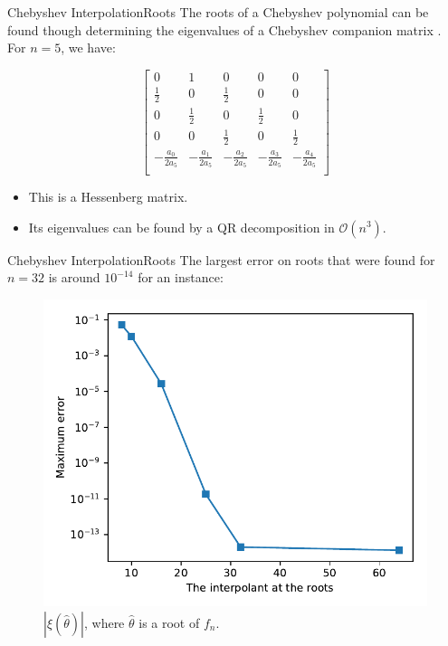 \documentclass{beamer}
\newcommand{\bigO}{\mathscr{O}}
\begin{document}
\begin{frame}{Chebyshev Interpolation}{Roots}
	The roots of a Chebyshev polynomial can be found though determining the eigenvalues of a Chebyshev companion matrix \cite{boyd:2013}. For $n=5$, we have:
	
	\begin{equation*}
	\left[\begin{array}{cccccc}
	0&1&0&0&0\\
	\frac{1}{2} & 0 & \frac{1}{2} & 0 & 0\\
	0 & \frac{1}{2} & 0 & \frac{1}{2} & 0\\
	0 & 0 & \frac{1}{2} & 0 & \frac{1}{2}\\
	-\frac{a_0}{2a_5} & -\frac{a_1}{2a_5} &-\frac{a_2}{2a_5} &-\frac{a_3}{2a_5} &-\frac{a_4}{2a_5}\\
	\end{array}\right]
	\end{equation*}
	
	\begin{itemize}
		\item This is a Hessenberg matrix.
		\item Its eigenvalues can be found by a QR decomposition in $\bigO(n^3)$.
	\end{itemize}
\end{frame}

\begin{frame}{Chebyshev Interpolation}{Roots}
	The largest error on roots that were found for $n=32$ is around $10^{-14}$ for an instance:
	\begin{figure}
		\centering
		
		\includegraphics[scale=.6]{error_roots}
		\caption{$|\xi(\hat{\theta})|$, where $\hat{\theta}$ is a root of $f_n$.}
	\end{figure}
\end{frame}
\end{document}

